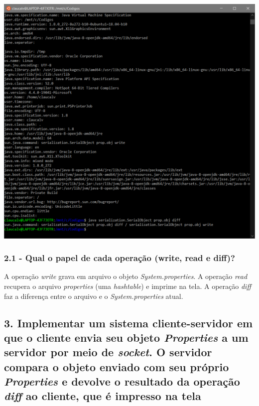 \begin{minipage}{\textwidth}
    \hspace{1em}
    \includegraphics[scale=.35]{pratica2remover/prints/serial3.PNG}
    \label{threadspng}
    \hspace{1em}
\end{minipage}
\vspace{0.5em}

\subsubsection{2.1 - Qual o papel de cada operação (write, read e diff)?}

A operação \textit{write} grava em arquivo o objeto \textit{System.properties}. A operação \textit{read} recupera o arquivo \textit{properties} (uma \textit{hashtable}) e imprime na tela. A operação \textit{diff} faz a diferença entre o arquivo e o \textit{System.properties} atual.

\subsection*{3. Implementar um sistema cliente-servidor em que o cliente envia seu objeto \textit{Properties} a um servidor por meio de \textit{socket}. O servidor compara o objeto enviado com seu próprio \textit{Properties} e devolve o resultado da operação \textit{diff} ao cliente, que é impresso na tela}

